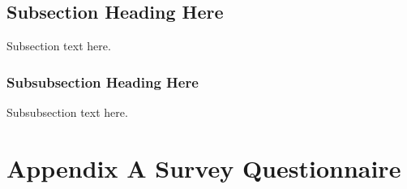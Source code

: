 \documentclass[conference]{IEEEtran}
\begin{document}
\subsection{Subsection Heading Here}
Subsection text here.


\subsubsection{Subsubsection Heading Here}
Subsubsection text here.
\fi




\iffalse 
\footnotesize

\section{Conclusion}
The conclusion goes here. 






\section*{Acknowledgment}


zzxzxz


\fi







\iffalse 
\begin{thebibliography}{1}

\bibitem{IEEEhowto:kopka}
H.~Kopka and P.~W. Daly, \emph{A Guide to \LaTeX}, 3rd~ed.\hskip 1em plus
0.5em minus 0.4em\relax Harlow, England: Addison-Wesley, 1999.

\end{thebibliography}




\section{Interview script}
Interview study 

\subsection*{ Demographics}

\begin{enumerate}
\item How old are you? ~\footnote{Most questions are open-ended questions}\\
\item How many people other than you live in your house?\\ 
\item What is each person's relationship to you?\\
\item What grade are you in school?\\
\end{enumerate}
\fi
\appendices

\section {Appendix A Survey Questionnaire}



\end{document}
